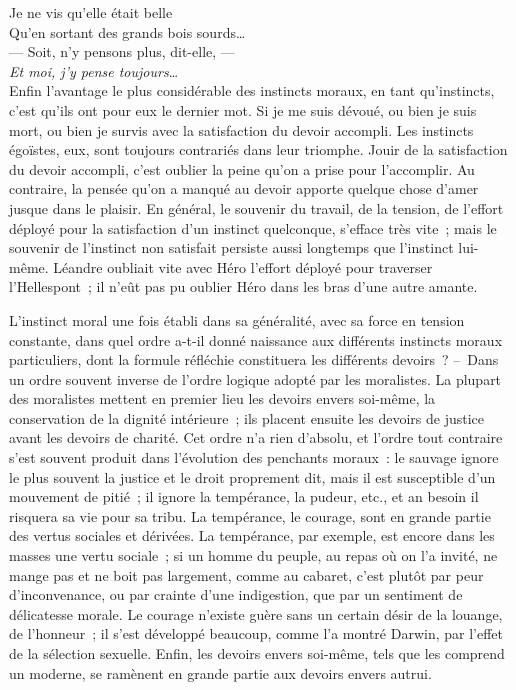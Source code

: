\documentclass[french,twoside]{book} %
\begin{document}
Je ne vis qu’elle était belle \\
Qu’en sortant des grands bois sourds… \\
— Soit, n’y pensons plus, dit-elle, — \\
\emph{Et moi, j’y pense toujours}…\\

\noindent Enfin l’avantage le plus considérable des instincts moraux, en tant qu’instincts, c’est qu’ils ont pour eux le dernier mot. Si je me suis dévoué, ou bien je suis mort, ou bien je survis avec la satisfaction du devoir accompli. Les instincts égoïstes, eux, sont toujours contrariés dans leur triomphe. Jouir de la satisfaction du devoir accompli, c’est oublier la peine qu’on a prise pour l’accomplir. Au contraire, la pensée qu’on a manqué au devoir apporte quelque chose d’amer jusque dans le plaisir. En général, le souvenir du travail, de la tension, de l’effort déployé pour la satisfaction d’un instinct quelconque, s’efface très vite ; mais le souvenir de l’instinct non satisfait persiste aussi longtemps que l’instinct lui-même. Léandre oubliait vite avec Héro l’effort déployé pour traverser l’Hellespont ; il n’eût pas pu oublier Héro dans les bras d’une autre amante.\par
L’instinct moral une fois établi dans sa généralité, avec sa force en tension constante, dans quel ordre a-t-il donné naissance aux différents instincts moraux particuliers, dont la formule réfléchie constituera les différents devoirs ? – Dans un ordre souvent inverse de l’ordre logique adopté par les moralistes. La plupart des moralistes mettent en premier lieu les devoirs envers soi-même, la conservation de la dignité intérieure ; ils placent ensuite les devoirs de justice avant les devoirs de charité. Cet ordre n’a rien d’absolu, et l’ordre tout contraire s’est souvent produit dans l’évolution des penchants moraux : le sauvage ignore le plus souvent la justice et le droit proprement dit, mais il est susceptible d’un mouvement de pitié ; il ignore la tempérance, la pudeur, etc., et an besoin il risquera sa vie pour sa tribu. La tempérance, le courage, sont en grande partie des vertus sociales et dérivées. La tempérance, par exemple, est encore dans les masses une vertu sociale ; si un homme du peuple, au repas où on l’a invité, ne mange pas et ne boit pas largement, comme au cabaret, c’est plutôt par peur d’inconvenance, ou par crainte d’une indigestion, que par un sentiment de délicatesse morale. Le courage n’existe guère sans un certain désir de la louange, de l’honneur ; il s’est développé beaucoup, comme l’a montré Darwin, par l’effet de la sélection sexuelle. Enfin, les devoirs envers soi-même, tels que les comprend un moderne, se ramènent en grande partie aux devoirs envers autrui.\par
\end{document}
